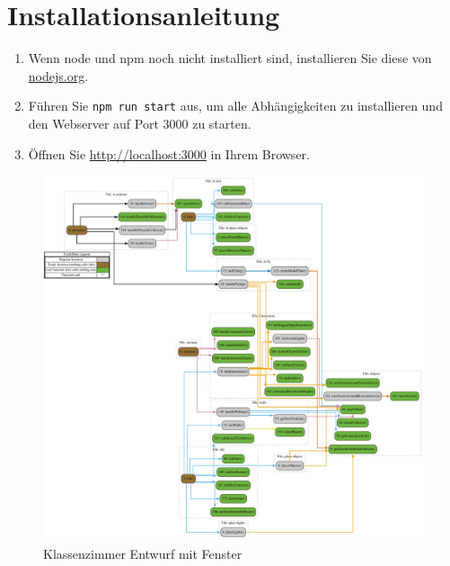 \section{Installationsanleitung}

\begin{enumerate}
  \item Wenn node und npm noch nicht installiert sind, installieren Sie diese von \href{https://nodejs.org/en/}{nodejs.org}.
  \item Führen Sie \texttt{npm run start} aus, um alle Abhängigkeiten zu installieren und den Webserver auf Port 3000 zu starten.
  \item Öffnen Sie \href{http://localhost:3000}{http://localhost:3000} in Ihrem Browser.
\end{enumerate}

\begin{figure}[H]
  \centering
  \includegraphics[width=1\textwidth]{images/function-call-graph.pdf}
  \caption{Klassenzimmer Entwurf mit Fenster}
  \label{fig:Entwurf}
\end{figure}\noindent